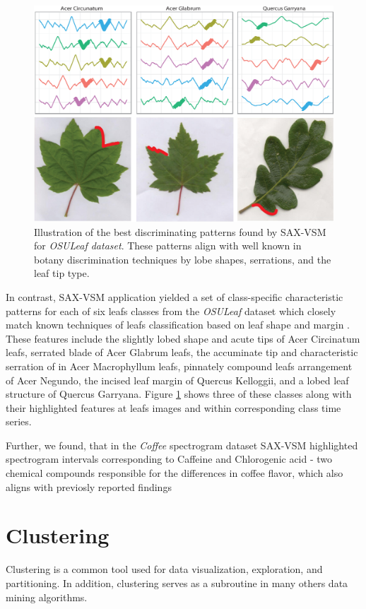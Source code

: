 \documentclass{llncs}
\begin{document}
\begin{figure}[t]
   \centering
   \includegraphics[width=115mm]{figures/AcerCircunatum.eps}
   \caption{Illustration of the best discriminating patterns found by SAX-VSM for
\textit{OSULeaf dataset}. These patterns align with well known in botany discrimination techniques
by lobe shapes, serrations, and the leaf tip type.}
   \label{fig:shapelet-acer-patterns}
\end{figure}

In contrast, SAX-VSM application yielded a set of class-specific characteristic patterns for each of
six leafs classes from the \textit{OSULeaf} dataset which closely match known techniques of leafs
classification based on leaf shape and margin \cite{dirr}. These features include the slightly
lobed shape and acute tips of Acer Circinatum leafs, serrated blade of Acer Glabrum leafs,
the accuminate tip and characteristic serration of in Acer Macrophyllum leafs, pinnately compound
leafs arrangement of Acer Negundo, the incised leaf margin of Quercus Kelloggii, and a lobed leaf
structure of Quercus Garryana. Figure \ref{fig:shapelet-acer-patterns} shows three of these classes
along with their highlighted features at leafs images and within corresponding class time series.

Further, we found, that in the \textit{Coffee} spectrogram dataset SAX-VSM highlighted spectrogram
intervals corresponding to Caffeine and Chlorogenic acid - two chemical compounds responsible for
the differences in coffee flavor, which also aligns with previosly reported findings \cite{coffee}

\section{Clustering}
Clustering is a common tool used for data visualization, exploration, and partitioning. 
In addition, clustering serves as a subroutine in many others data mining algorithms.
\end{document}
